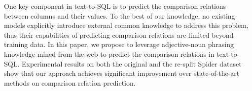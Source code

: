 One key component in text-to-SQL is to predict the comparison relations between columns and their values.
To the best of our knowledge, no existing models explicitly introduce external common knowledge to address this problem, thus their capabilities of predicting comparison relations are limited beyond training data.
In this paper, we propose to leverage adjective-noun phrasing knowledge mined from the web to predict the comparison relations in text-to-SQL.
Experimental results on both the original and the re-split Spider dataset show that our approach achieves significant improvement over state-of-the-art methods on comparison relation prediction.